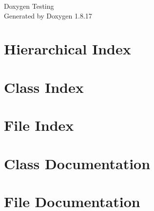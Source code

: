 \let\mypdfximage\pdfximage\def\pdfximage{\immediate\mypdfximage}\documentclass[twoside]{book}
\newcommand{\+}{\discretionary{\mbox{\scriptsize$\hookleftarrow$}}{}{}}
\newcommand{\clearemptydoublepage}{%
  \newpage{\pagestyle{empty}\cleardoublepage}%
}
\begin{document}
\hypersetup{pageanchor=false,
             bookmarksnumbered=true,
             pdfencoding=unicode
            }
\begin{titlepage}
\vspace*{7cm}
\begin{center}%
{\Large Doxygen Testing }\\
\vspace*{1cm}
{\large Generated by Doxygen 1.8.17}\\
\end{center}
\end{titlepage}
\clearemptydoublepage
{}
\tableofcontents
\clearemptydoublepage
{}
\hypersetup{pageanchor=true}

\chapter{Hierarchical Index}

\chapter{Class Index}

\chapter{File Index}

\chapter{Class Documentation}



\chapter{File Documentation}




\backmatter
\newpage
{}
\clearemptydoublepage
{}
\printindex
\end{document}
